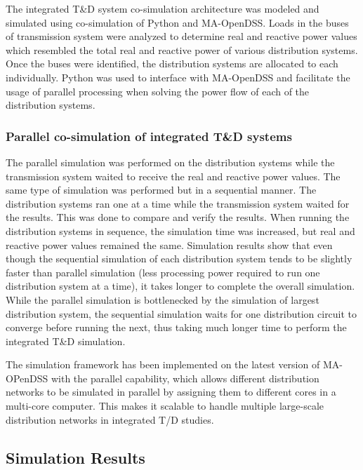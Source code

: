 \documentclass{article}
\begin{document}
The integrated T\&D system co-simulation architecture was modeled and simulated using co-simulation of Python and MA-OpenDSS. Loads in the buses of transmission system were analyzed to determine real and reactive power values which resembled the total real and reactive power of various distribution systems. Once the buses were identified, the distribution systems are allocated to each individually. Python was used to interface with MA-OpenDSS and facilitate the usage of parallel processing when solving the power flow of each of the distribution systems. \par

\subsubsection{Parallel co-simulation of integrated T\&D systems}
The parallel simulation was performed on the distribution systems while the transmission system waited to receive the real and reactive power values. The same type of simulation was performed but in a sequential manner. The distribution systems ran one at a time while the transmission system waited for the results. This was done to compare and verify the results. When running the distribution systems in sequence, the simulation time was increased, but real and reactive power values remained the same. Simulation results show that even though the sequential simulation of each distribution system tends to be slightly faster than parallel simulation (less processing power required to run one distribution system at a time), it takes longer to complete the overall simulation. While the parallel simulation is bottlenecked by the simulation of largest distribution system, the sequential simulation waits for one distribution circuit to converge before running the next, thus taking much longer time to perform the integrated T\&D simulation.\par

The simulation framework has been implemented on the latest version of MA-OPenDSS with the parallel capability, which allows different distribution networks to be simulated in parallel by assigning them to different cores in a multi-core computer. This makes it scalable to handle multiple large-scale distribution networks in integrated T/D studies.\par

\subsection{Simulation Results}
\end{document}
